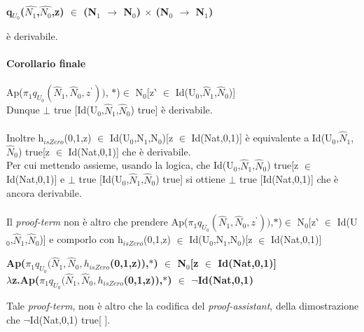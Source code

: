 \normalsize
\begin{center}\textbf{q$_{U_0}$($\hat{N_1}$,$\hat{N_0}$,z) $\in$ (N$_1$ $\rightarrow$ N$_0$) $\times$ (N$_0$ $\rightarrow$ N$_1$)}\end{center} \`e derivabile.
\\\\
\noindent
\textbf{Corollario finale}\\\\
\noindent
Ap($\pi_1 q_{U_0}(\hat{N}_1,\hat{N}_0,z^\backprime))$, $\ast$)$\in$ N$_0$[z$\backprime$ $\in$ Id(U$_0$,$\hat{N}_1$,$\hat{N}_0$)]\\
Dunque $\bot$ true [Id(U$_0$,$\hat{N}_1$,$\hat{N}_0$) true] \`e derivabile.\\\\
\noindent
Inoltre h$_{isZero}$(0,1,z) $\in$ Id(U$_0$,N$_1$,N$_0$)[z $\in$ Id(Nat,0,1)] \`e equivalente a Id(U$_0$,$\hat{N}_1$,$\hat{N}_0$) true[z $\in$ Id(Nat,0,1)] che  \`e derivabile.\\
Per cui mettendo assieme, usando la logica, che Id(U$_0$,$\hat{N}_1$,$\hat{N}_0$) true[z $\in$ Id(Nat,0,1)]  e $\bot$ true [Id(U$_0$,$\hat{N}_1$,$\hat{N}_0$) true] si ottiene $\bot$ true [Id(Nat,0,1)] che \`e ancora derivabile.\\\\
\noindent 
Il \textit{proof-term} non \`e altro che prendere Ap($\pi_1 q_{U_0}(\hat{N}_1,\hat{N}_0,z^\backprime))$,$\ast$)$\in$ N$_0$[z$\backprime$ $\in$ Id(U$_0$,$\hat{N}_1$,$\hat{N}_0$)] e comporlo con h$_{isZero}$(0,1,z) $\in$ Id(U$_0$,N$_1$,N$_0$)[z $\in$ Id(Nat,0,1)]
\begin{center}\textbf{Ap($\pi_1 q_{U_0}(\hat{N}_1,\hat{N}_0,h_{isZero}$(0,1,z)),$\ast$) $\in$ N$_0$[z $\in$ Id(Nat,0,1)]} \\ \textbf{$\lambda$z.Ap($\pi_1 q_{U_0}(\hat{N}_1,\hat{N}_0,h_{isZero}$(0,1,z)),$\ast$) $\in$ $\neg$Id(Nat,0,1) }\end{center}
\noindent
Tale \textit{proof-term}, non \`e altro che la codifica del \textit{proof-assistant}, della dimostrazione che $\neg$Id(Nat,0,1) true[ ].

